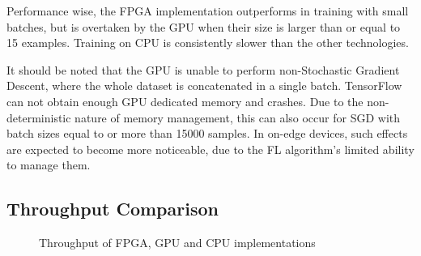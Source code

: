 Performance wise, the FPGA implementation outperforms in training with small batches, but is overtaken by the GPU when their size is larger than or equal to 15 examples. Training on CPU is consistently slower than the other technologies.

It should be noted that the GPU is unable to perform non-Stochastic Gradient Descent, where the whole dataset is concatenated in a single batch. TensorFlow can not obtain enough GPU dedicated memory and crashes. Due to the non-deterministic nature of memory management, this can also occur for SGD with batch sizes equal to or more than 15000 samples. In on-edge devices, such effects are expected to become more noticeable, due to the FL algorithm's limited ability to manage them.

\subsection{Throughput Comparison}
\begin{figure}[H]
    \center
    \caption[FPGA, GPU, CPU throughput comparison]{Throughput of FPGA, GPU and CPU implementations}
    \label{fig: FPGA CPU GPU throughput}
\end{figure}

